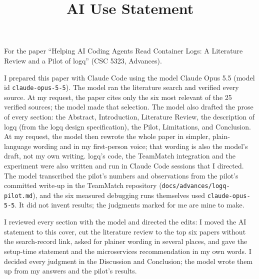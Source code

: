 \documentclass[10pt,conference,onecolumn]{IEEEtran}
\newcommand{\cmd}[1]{\texttt{#1}}
\begin{document}
\title{AI Use Statement}
\author{}
\maketitle

\noindent For the paper ``Helping AI Coding Agents Read Container Logs: A Literature Review and a Pilot of logq'' (CSC 5323, Advances).

\bigskip
I prepared this paper with Claude Code using the model Claude Opus 5.5 (model id \cmd{claude-opus-5-5}). The model ran the literature search and verified every source. At my request, the paper cites only the six most relevant of the 25 verified sources; the model made that selection. The model also drafted the prose of every section: the Abstract, Introduction, Literature Review, the description of logq (from the logq design specification), the Pilot, Limitations, and Conclusion. At my request, the model then rewrote the whole paper in simpler, plain-language wording and in my first-person voice; that wording is also the model's draft, not my own writing. logq's code, the TeamMatch integration and the experiment were also written and run in Claude Code sessions that I directed. The model transcribed the pilot's numbers and observations from the pilot's committed write-up in the TeamMatch repository (\cmd{docs/advances/logq-pilot.md}), and the six measured debugging runs themselves used \cmd{claude-opus-5-5}. It did not invent results; the judgments marked for me are mine to make.

\bigskip
I reviewed every section with the model and directed the edits: I moved the AI statement to this cover, cut the literature review to the top six papers without the search-record link, asked for plainer wording in several places, and gave the setup-time statement and the microservices recommendation in my own words. I decided every judgment in the Discussion and Conclusion; the model wrote them up from my answers and the pilot's results.
\end{document}
